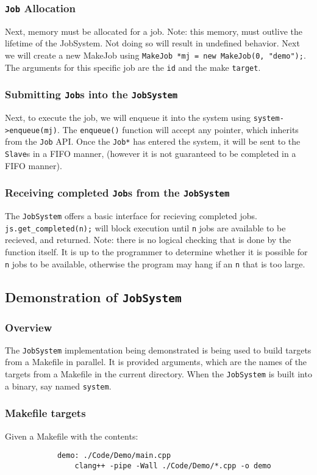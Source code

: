 \documentclass{article}
\begin{document}
		\subsubsection{\texttt{Job} Allocation}
			Next, memory must be allocated for a job. Note: this memory, must outlive the lifetime of the JobSystem. Not doing so will result in undefined behavior. Next we will create a new MakeJob using \texttt{MakeJob *mj = new MakeJob(0, "demo");}. The arguments for this specific job are the \texttt{id} and the make \texttt{target}. 
		\subsubsection{Submitting \texttt{Job}s into the \texttt{JobSystem}}
			Next, to execute the job, we will enqueue it into the system using \texttt{system->enqueue(mj)}. The \texttt{enqueue()} function will accept any pointer, which inherits from the \texttt{Job} API. Once the \texttt{Job*} has entered the system, it will be sent to the \texttt{Slave}s in a FIFO manner, (however it is not guaranteed to be completed in a FIFO manner).
		\subsubsection{Receiving completed \texttt{Job}s from the \texttt{JobSystem}}
			The \texttt{JobSystem} offers a basic interface for recieving completed jobs. \texttt{js.get\_completed(n);} will block execution until \texttt{n} jobs are available to be recieved, and returned. Note: there is no logical checking that is done by the function itself. It is up to the programmer to determine whether it is possible for \texttt{n} jobs to be available, otherwise the program may hang if an \texttt{n} that is too large.
	
	\subsection{Demonstration of \texttt{JobSystem}}
		\subsubsection{Overview}
			The \texttt{JobSystem} implementation being demonstrated is being used to build targets from a Makefile in parallel. It is provided arguments, which are the names of the targets from a Makefile in the current directory. When the \texttt{JobSystem} is built into a binary, say named \texttt{system}.
			
		\subsubsection{Makefile targets}
			Given a Makefile with the contents:
			\begin{verbatim}
			demo: ./Code/Demo/main.cpp
				clang++ -pipe -Wall ./Code/Demo/*.cpp -o demo
			\end{verbatim}
\end{document}
